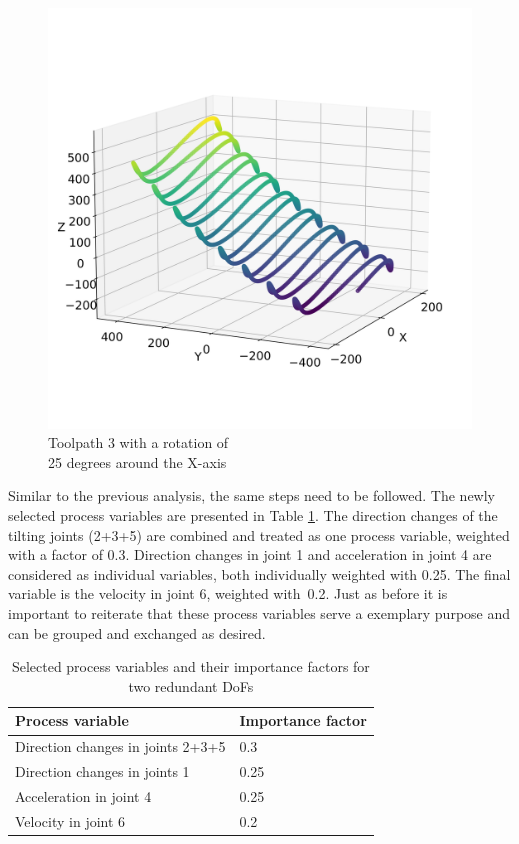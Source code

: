 \begin{figure}[H]
\begin{minipage}{0.5\textwidth}
		\includegraphics[width=\textwidth]{figures/path3_kipp_25_comparison.png}
		\caption{Toolpath 3 with a rotation of\\ 25 degrees around the X-axis}
		\label{TP3_25}
	\end{minipage}\par
\end{figure}
 

Similar to the previous analysis, the same steps need to be followed. The newly selected process variables are presented in Table \ref{PP_2}. The direction changes of the tilting joints (2+3+5) are combined and treated as one process variable, weighted with a factor of 0.3. Direction changes in joint 1 and acceleration in joint 4 are considered as individual variables, both individually weighted with 0.25. The final variable is the velocity in joint 6, weighted with~0.2. Just as before it is important to reiterate that these process variables serve a exemplary purpose and can be grouped and exchanged as desired.

\begin{table}[H]
	\centering
	\caption{Selected process variables and their importance factors for two redundant DoFs}
	\begin{tabular}{||l|l||}
		Process variable & Importance factor \\
		\hline
		\hline
		\hline
		Direction changes in joints 2+3+5	&		0.3 \\
		Direction changes in joints 1	& 	0.25 \\
		Acceleration in joint 4	& 		0.25\\
		Velocity in joint 6	& 		0.2\\
		\hline
		\hline
	\end{tabular}
	
	
	\label{PP_2}
\end{table}


